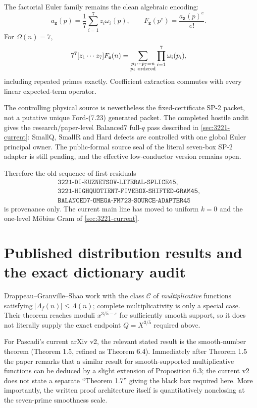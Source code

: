 \documentclass[11pt]{article}
\theoremstyle{definition}
\newcommand{\1}{\mathbf 1}
\begin{document}
The factorial Euler family remains the clean algebraic encoding:
\[
a_{\mathbf z}(p)=\frac17\sum_{i=1}^7z_i\omega_i(p),
\qquad
F_{\mathbf z}(p^e)=\frac{a_{\mathbf z}(p)^e}{e!}.
\]
For $\Omega(n)=7$,
\[
7^7[z_1\cdots z_7]F_{\mathbf z}(n)
=
\sum_{\substack{p_1\cdots p_7=n\\p_i\ {\rm ordered}}}
\prod_{i=1}^7\omega_i(p_i),
\]
including repeated primes exactly.  Coefficient extraction commutes with every linear
expected-term operator.

The controlling physical source is nevertheless the fixed-certificate SP-2 packet, not a
putative unique Ford-(7.23) generated packet.  The completed hostile audit gives the
research/paper-level Balanced7 full-$q$ pass described in \cref{sec:3221-current}:
SmallQ, SmallR and Hard defects are controlled with one global Euler principal owner.
The public-formal source seal of the literal seven-box SP-2 adapter is still pending, and
the effective low-conductor version remains open.

Therefore the old sequence of first residuals
\[
\begin{gathered}
\texttt{3221-DI-KUZNETSOV-LITERAL-SPLICE45},\\
\texttt{3221-HIGHQUOTIENT-FIVEBOX-SHIFTED-GRAM45},\\
\texttt{BALANCED7-OMEGA-FM723-SOURCE-ADAPTER45}
\end{gathered}
\]
is provenance only.  The current main line has moved to uniform $k=0$ and the one-level
M\"obius Gram of \cref{sec:3221-current}.


\section{Published distribution results and the exact dictionary audit}

Drappeau--Granville--Shao work with the class $\mathcal C$ of
\emph{multiplicative} functions satisfying
$|\Lambda_f(n)|\le\Lambda(n)$; complete multiplicativity is only a special case.
Their theorem reaches moduli $x^{3/5-\varepsilon}$ for sufficiently smooth support, so it
does not literally supply the exact endpoint $Q=X^{3/5}$ required above.

For Pascadi's current arXiv v2, the relevant stated result is the smooth-number theorem
(Theorem 1.5, refined as Theorem 6.4).  Immediately after Theorem 1.5 the paper remarks
that a similar result for smooth-supported multiplicative functions can be deduced by a
slight extension of Proposition 6.3; the current v2 does not state a separate
``Theorem 1.7'' giving the black box required here.  More importantly, the written proof
architecture itself is quantitatively nonclosing at the seven-prime smoothness scale.
\end{document}
